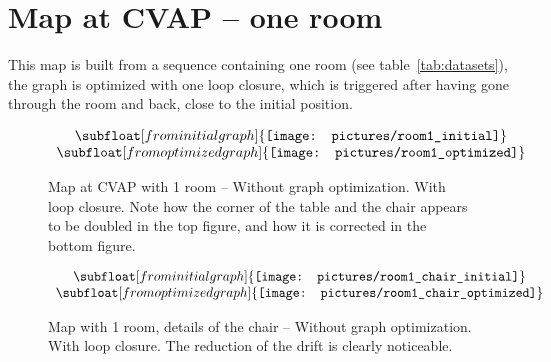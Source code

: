 %
%


\cleardoublepage
\section{Map at CVAP -- one room}

This map is built from a sequence containing one room (see table~\ref{tab:datasets}), the graph is optimized with one loop closure, which is triggered after having gone through the room and back, close to the initial position. 

\begin{figure}[H]
\centering$
\begin{array}{c}
\subfloat[from initial graph]{\label{fig:room1_1}\texttt{[image: pictures/room1\_initial]}} \\
\subfloat[from optimized graph]{\label{fig:room1_2}\texttt{[image: pictures/room1\_optimized]}}
\end{array}$
\caption{Map at CVAP with 1 room -- \protect{} Without graph optimization. \protect{} With loop closure. Note how the corner of the table and the chair appears to be doubled in the top figure, and how it is corrected in the bottom figure.}
\end{figure}

\begin{figure}[H]
\centering$
\begin{array}{c}
\subfloat[from initial graph]{\label{fig:room1_chair_1}\texttt{[image: pictures/room1\_chair\_initial]}} \\
\subfloat[from optimized graph]{\label{fig:room1_chair_2}\texttt{[image: pictures/room1\_chair\_optimized]}}
\end{array}$
\caption{Map with 1 room, details of the chair -- \protect{} Without graph optimization. \protect{} With loop closure. The reduction of the drift is clearly noticeable.}
\end{figure}

